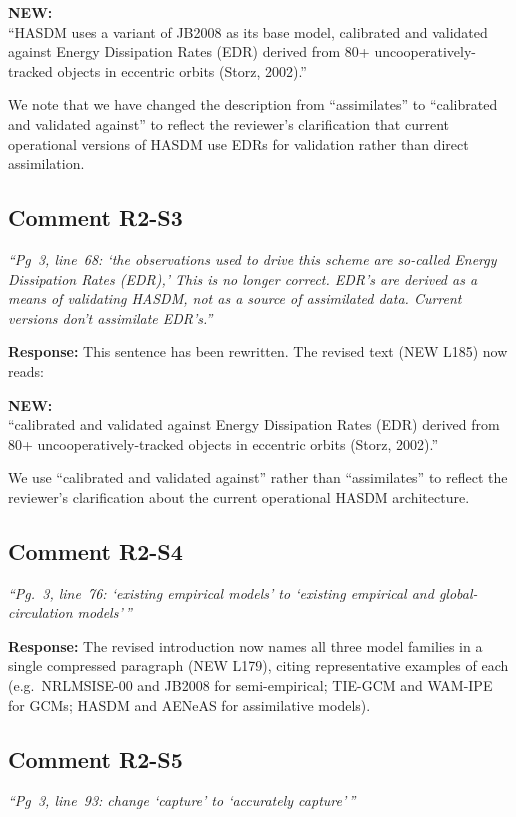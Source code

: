 \documentclass[11pt]{article}
\newcommand{\reviewercomment}[1]{%
  \medskip
  \noindent\textit{\color{reviewblue}#1}%
  \medskip
}
\newcommand{\newtext}[1]{%
  \smallskip
  \noindent\hspace{1em}\begin{minipage}{0.92\textwidth}%
  \color{quotegreen}\textbf{NEW:}\\[2pt]``#1''%
  \end{minipage}%
  \smallskip
}
\begin{document}
\newtext{HASDM uses a variant of JB2008 as its base model, calibrated and validated against Energy Dissipation Rates (EDR) derived from 80+ uncooperatively-tracked objects in eccentric orbits (Storz, 2002).}

We note that we have changed the description from ``assimilates'' to ``calibrated and validated against'' to reflect the reviewer's clarification that current operational versions of HASDM use EDRs for validation rather than direct assimilation.


\subsection{Comment R2-S3}

\reviewercomment{%
``Pg~3, line~68: `the observations used to drive this scheme are so-called Energy Dissipation Rates (EDR),' This is no longer correct. EDR's are derived as a means of validating HASDM, not as a source of assimilated data. Current versions don't assimilate EDR's.''}

\textbf{Response:}
This sentence has been rewritten. The revised text (NEW L185) now reads:

\newtext{calibrated and validated against Energy Dissipation Rates (EDR) derived from 80+ uncooperatively-tracked objects in eccentric orbits (Storz, 2002).}

We use ``calibrated and validated against'' rather than ``assimilates'' to reflect the reviewer's clarification about the current operational HASDM architecture.


\subsection{Comment R2-S4}

\reviewercomment{%
``Pg.~3, line~76: `existing empirical models' to `existing empirical and global-circulation models'\,''}

\textbf{Response:}
The revised introduction now names all three model families in a single compressed paragraph (NEW L179), citing representative examples of each (e.g.\ NRLMSISE-00 and JB2008 for semi-empirical; TIE-GCM and WAM-IPE for GCMs; HASDM and AENeAS for assimilative models).


\subsection{Comment R2-S5}

\reviewercomment{``Pg~3, line~93: change `capture' to `accurately capture'\,''}
\end{document}
